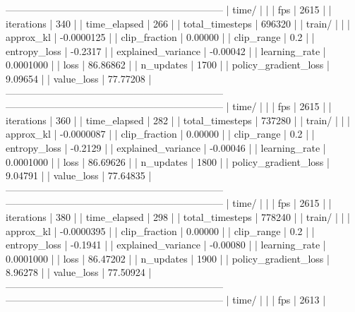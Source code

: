 ------------------------------------------------------------------
| time/                   |              |
|    fps                  |         2615 |
|    iterations           |          340 |
|    time_elapsed         |          266 |
|    total_timesteps      |       696320 |
| train/                  |              |
|    approx_kl            |   -0.0000125 |
|    clip_fraction        |      0.00000 |
|    clip_range           |          0.2 |
|    entropy_loss         |      -0.2317 |
|    explained_variance   |     -0.00042 |
|    learning_rate        |    0.0001000 |
|    loss                 |     86.86862 |
|    n_updates            |         1700 |
|    policy_gradient_loss |      9.09654 |
|    value_loss           |     77.77208 |
------------------------------------------------------------------
------------------------------------------------------------------
| time/                   |              |
|    fps                  |         2615 |
|    iterations           |          360 |
|    time_elapsed         |          282 |
|    total_timesteps      |       737280 |
| train/                  |              |
|    approx_kl            |   -0.0000087 |
|    clip_fraction        |      0.00000 |
|    clip_range           |          0.2 |
|    entropy_loss         |      -0.2129 |
|    explained_variance   |     -0.00046 |
|    learning_rate        |    0.0001000 |
|    loss                 |     86.69626 |
|    n_updates            |         1800 |
|    policy_gradient_loss |      9.04791 |
|    value_loss           |     77.64835 |
------------------------------------------------------------------
------------------------------------------------------------------
| time/                   |              |
|    fps                  |         2615 |
|    iterations           |          380 |
|    time_elapsed         |          298 |
|    total_timesteps      |       778240 |
| train/                  |              |
|    approx_kl            |   -0.0000395 |
|    clip_fraction        |      0.00000 |
|    clip_range           |          0.2 |
|    entropy_loss         |      -0.1941 |
|    explained_variance   |     -0.00080 |
|    learning_rate        |    0.0001000 |
|    loss                 |     86.47202 |
|    n_updates            |         1900 |
|    policy_gradient_loss |      8.96278 |
|    value_loss           |     77.50924 |
------------------------------------------------------------------
------------------------------------------------------------------
| time/                   |              |
|    fps                  |         2613 |
